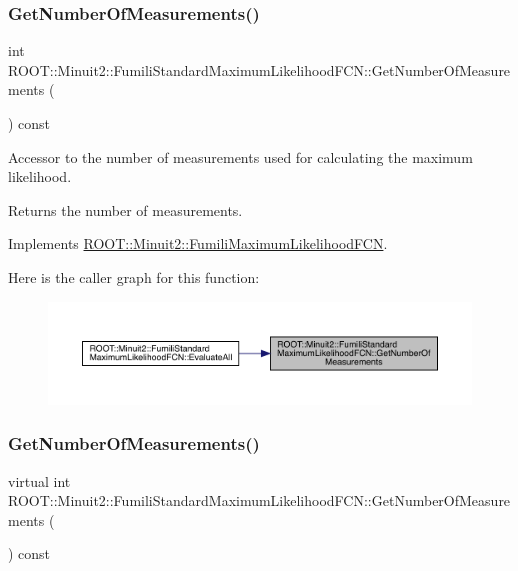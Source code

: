 \subsubsection{\texorpdfstring{GetNumberOfMeasurements()}{GetNumberOfMeasurements()}\hspace{0.1cm}{\footnotesize\ttfamily [1/3]}}
{\footnotesize\ttfamily int R\+O\+O\+T\+::\+Minuit2\+::\+Fumili\+Standard\+Maximum\+Likelihood\+F\+C\+N\+::\+Get\+Number\+Of\+Measurements (\begin{DoxyParamCaption}{ }\end{DoxyParamCaption}) const\hspace{0.3cm}{\ttfamily [virtual]}}

Accessor to the number of measurements used for calculating the maximum likelihood.

\begin{DoxyReturn}{Returns}
the number of measurements. 
\end{DoxyReturn}


Implements \mbox{\hyperlink{classROOT_1_1Minuit2_1_1FumiliMaximumLikelihoodFCN_af0a6b5a302f978363074039c7d55d529}{R\+O\+O\+T\+::\+Minuit2\+::\+Fumili\+Maximum\+Likelihood\+F\+CN}}.

Here is the caller graph for this function\+:
\nopagebreak
\begin{figure}[H]
\begin{center}
\leavevmode
\includegraphics[width=350pt]{dd/d40/classROOT_1_1Minuit2_1_1FumiliStandardMaximumLikelihoodFCN_a09175207d6c0ed94898f3985b4d376d2_icgraph}
\end{center}
\end{figure}
\mbox{\label{classROOT_1_1Minuit2_1_1FumiliStandardMaximumLikelihoodFCN_a7c1f879db750fb33c206d3edbbd19ae0}} 
\subsubsection{\texorpdfstring{GetNumberOfMeasurements()}{GetNumberOfMeasurements()}\hspace{0.1cm}{\footnotesize\ttfamily [2/3]}}
{\footnotesize\ttfamily virtual int R\+O\+O\+T\+::\+Minuit2\+::\+Fumili\+Standard\+Maximum\+Likelihood\+F\+C\+N\+::\+Get\+Number\+Of\+Measurements (\begin{DoxyParamCaption}{ }\end{DoxyParamCaption}) const\hspace{0.3cm}{\ttfamily [virtual]}}

